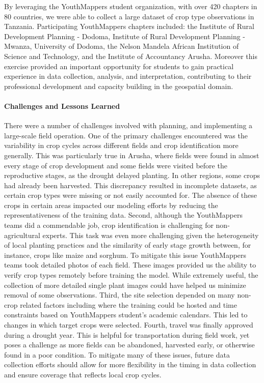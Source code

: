 \documentclass[
]{article}
\begin{document}
By leveraging the YouthMappers student organization, with over 420
chapters in 80 countries, we were able to collect a large dataset of
crop type observations in Tanzania. Participating YouthMappers chapters
included: the Institute of Rural Development Planning - Dodoma,
Institute of Rural Development Planning - Mwanza, University of Dodoma,
the Nelson Mandela African Institution of Science and Technology, and
the Institute of Accountancy Arusha. Moreover this exercise provided an
important opportunity for students to gain practical experience in data
collection, analysis, and interpretation, contributing to their
professional development and capacity building in the geospatial domain.

\hypertarget{challenges-and-lessons-learned}{%
\paragraph{Challenges and Lessons
Learned}\label{challenges-and-lessons-learned}}

There were a number of challenges involved with planning, and
implementing a large-scale field operation. One of the primary
challenges encountered was the variability in crop cycles across
different fields and crop identification more generally. This was
particularly true in Arusha, where fields were found in almost every
stage of crop development and some fields were visited before the
reproductive stages, as the drought delayed planting. In other regions,
some crops had already been harvested. This discrepancy resulted in
incomplete datasets, as certain crop types were missing or not easily
accounted for. The absence of these crops in certain areas impacted our
modeling efforts by reducing the representativeness of the training
data. Second, although the YouthMappers teams did a commendable job,
crop identification is challenging for non-agricultural experts. This
task was even more challenging given the heterogeneity of local planting
practices and the similarity of early stage growth between, for
instance, crops like maize and sorghum. To mitigate this issue
YouthMappers teams took detailed photos of each field. These images
provided us the ability to verify crop types remotely before training
the model. While extremely useful, the collection of more detailed
single plant images could have helped us minimize removal of some
observations. Third, the site selection depended on many non-crop
related factors including where the training could be hosted and time
constraints based on YouthMappers student's academic calendars. This led
to changes in which target crops were selected. Fourth, travel was
finally approved during a drought year. This is helpful for
transportation during field work, yet poses a challenge as more fields
can be abandoned, harvested early, or otherwise found in a poor
condition. To mitigate many of these issues, future data collection
efforts should allow for more flexibility in the timing in data
collection and ensure coverage that reflects local crop cycles.
\end{document}
